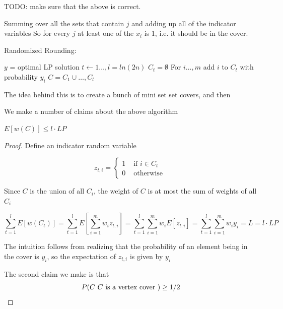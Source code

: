 \documentclass[../notes.tex]{subfiles}
\begin{document}
TODO: make sure that the above is correct.

Summing over all the sets that contain $ j $ and adding up all of the indicator variables
So for every $ j $ at least one of the $ x_i $ is 1, i.e. it should be in the cover.


Randomized Rounding:

\begin{codebox}
\li$ y $ = optimal LP solution
\li\For $  t \gets 1 \ldots, l = ln(2n) $ \Do 
\li    $ C_t = \emptyset $
\li    For $ i \ldots,  m $ add $ i $ to $ C_t $ with probability $ y_i $ \End
\li$ C = C_1 \cup \ldots, C_l $
\end{codebox}


The idea behind this is to create a bunch of mini set set covers, and then 


We make a number of claims about the above algorithm

\begin{lemma}
$ E[w(C)] \le  l \cdot  LP $
\end{lemma}



\begin{proof}
    Define an indicator random variable

    \begin{equation}
        z_{t, i} = \begin{cases}
            1 & \text{ if } i \in C_t \\
            0 & \text{ otherwise }
        \end{cases}
    \end{equation}

    Since $ C $ is the union of all $ C_i $, the weight of $ C $ is at most the sum of weights of all $ C_i $

    \begin{equation}
        \sum^l_{t=1} E[w(C_t)] = \sum^l_{t=1} E[\sum_{i = 1}^m w_i z_{t,i}] = \sum^l_{t=1} \sum_{i = 1}^m w_i E[z_{t,i}] = \sum^l_{t=1} \sum_{i=1}^m w_i y_i = L = l \cdot  LP
    \end{equation}

    The intuition follows from realizing that the probability of an element being in the cover is $ y_i $, so the expectation of $ z_{t,i} $ is given by $ y_i $


    The second claim we make is that
    \begin{equation}
        P(C \text{ $ C $ is a vertex cover }) \ge  1/2
    \end{equation}
\end{proof}
\end{document}
